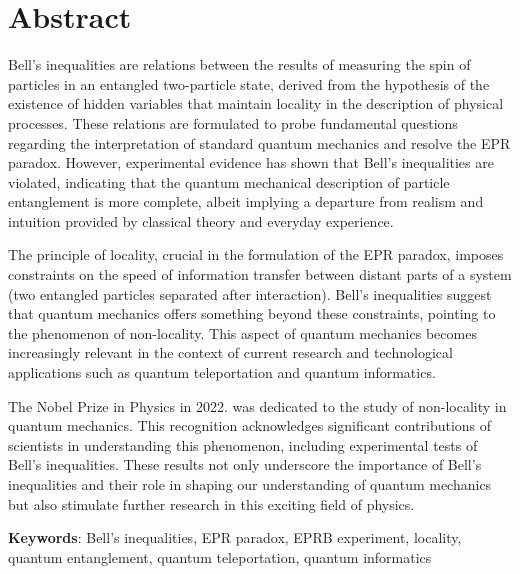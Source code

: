 \chapter*{Abstract}

Bell's inequalities are relations between the results of measuring the spin of particles in an entangled two-particle state, derived from the hypothesis of the existence of hidden variables that maintain locality in the description of physical processes. These relations are formulated to probe fundamental questions regarding the interpretation of standard quantum mechanics and resolve the EPR paradox.
However, experimental evidence has shown that Bell's inequalities are violated, indicating that the quantum mechanical description of particle entanglement is more complete, albeit implying a departure from realism and intuition provided by classical theory and everyday experience.

The principle of locality, crucial in the formulation of the EPR paradox, imposes constraints on the speed of information transfer between distant parts of a system (two entangled particles separated after interaction). Bell's inequalities suggest that quantum mechanics offers something beyond these constraints, pointing to the phenomenon of non-locality. This aspect of quantum mechanics becomes increasingly relevant in the context of current research and technological applications such as quantum teleportation and quantum informatics.

The Nobel Prize in Physics in 2022. was dedicated to the study of non-locality in quantum mechanics. This recognition acknowledges significant contributions of scientists in understanding this phenomenon, including experimental tests of Bell's inequalities. These results not only underscore the importance of Bell's inequalities and their role in shaping our understanding of quantum mechanics but also stimulate further research in this exciting field of physics.



{\textbf{Keywords}}: Bell's inequalities, EPR paradox, EPRB experiment, locality, quantum entanglement, quantum teleportation, quantum informatics